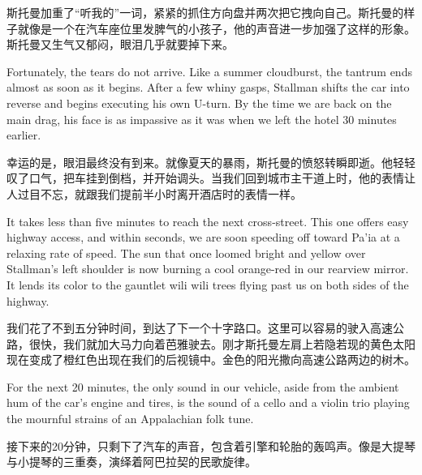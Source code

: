 \ifdefined\chs
斯托曼加重了``听我的''一词，紧紧的抓住方向盘并两次把它拽向自己。斯托曼的样子就像是一个在汽车座位里发脾气的小孩子，他的声音进一步加强了这样的形象。斯托曼又生气又郁闷，眼泪几乎就要掉下来。
\fi

\ifdefined\eng
Fortunately, the tears do not arrive. Like a summer cloudburst, the tantrum ends almost as soon as it begins. After a few whiny gasps, Stallman shifts the car into reverse and begins executing his own U-turn. By the time we are back on the main drag, his face is as impassive as it was when we left the hotel 30 minutes earlier.
\fi

\ifdefined\chs
幸运的是，眼泪最终没有到来。就像夏天的暴雨，斯托曼的愤怒转瞬即逝。他轻轻叹了口气，把车挂到倒档，并开始调头。当我们回到城市主干道上时，他的表情让人过目不忘，就跟我们提前半小时离开酒店时的表情一样。
\fi

\ifdefined\eng
It takes less than five minutes to reach the next cross-street. This one offers easy highway access, and within seconds, we are soon speeding off toward Pa'ia at a relaxing rate of speed. The sun that once loomed bright and yellow over Stallman's left shoulder is now burning a cool orange-red in our rearview mirror. It lends its color to the gauntlet wili wili trees flying past us on both sides of the highway.
\fi

\ifdefined\chs
我们花了不到五分钟时间，到达了下一个十字路口。这里可以容易的驶入高速公路，很快，我们就加大马力向着芭雅驶去。刚才斯托曼左肩上若隐若现的黄色太阳现在变成了橙红色出现在我们的后视镜中。金色的阳光撒向高速公路两边的树木。
\fi

\ifdefined\eng
For the next 20 minutes, the only sound in our vehicle, aside from the ambient hum of the car's engine and tires, is the sound of a cello and a violin trio playing the mournful strains of an Appalachian folk tune.
\fi

\ifdefined\chs
接下来的20分钟，只剩下了汽车的声音，包含着引擎和轮胎的轰鸣声。像是大提琴与小提琴的三重奏，演绎着阿巴拉契的民歌旋律。
\fi

\theendnotes
\setcounter{endnote}{0}
